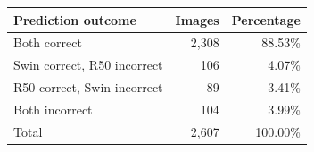 \begin{tabular}{lrr}
\toprule
Prediction outcome & Images & Percentage\\
\midrule
Both correct & 2,308 & 88.53\%\\
Swin correct, R50 incorrect & 106 & 4.07\%\\
R50 correct, Swin incorrect & 89 & 3.41\%\\
Both incorrect & 104 & 3.99\%\\
Total & 2,607 & 100.00\%\\
\bottomrule
\end{tabular}